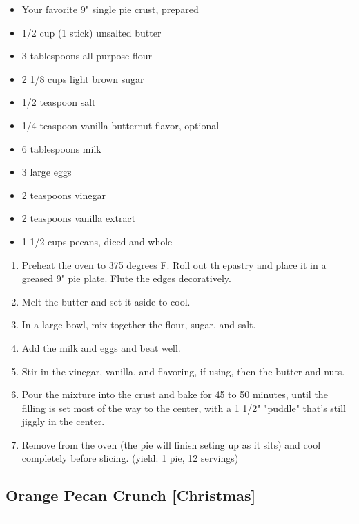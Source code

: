 \documentclass{article}
\begin{document}
\begin{framed}
    \begin{itemize}
        \item Your favorite 9" single pie crust, prepared
        \item 1/2 cup (1 stick) unsalted butter
        \item 3 tablespoons all-purpose flour
        \item 2 1/8 cups light brown sugar
        \item 1/2 teaspoon salt
        \item 1/4 teaspoon vanilla-butternut flavor, optional
        \item 6 tablespoons milk
        \item 3 large eggs
        \item 2 teaspoons vinegar
        \item 2 teaspoons vanilla extract
        \item 1 1/2 cups pecans, diced and whole
    \end{itemize}
\end{framed}

\begin{enumerate}
    \item 
        Preheat the oven to 375 degrees F. Roll out th epastry and place it in a greased 9" pie plate. Flute the edges decoratively.
    \item 
        Melt the butter and set it aside to cool.
    \item 
        In a large bowl, mix together the flour, sugar, and salt.
    \item 
        Add the milk and eggs and beat well.
    \item 
        Stir in the vinegar, vanilla, and flavoring, if using, then the butter and nuts.
    \item 
        Pour the mixture into the crust and bake for 45 to 50 minutes, until the filling is set most of the way to the center, with a 1 1/2" "puddle" that's still jiggly in the center.
    \item 
        Remove from the oven (the pie will finish seting up as it sits) and cool completely before slicing. (yield: 1 pie, 12 servings)
\end{enumerate}
\newpage 

\subsection{Orange Pecan Crunch [Christmas]} 
\noindent\rule[0.5ex]{\linewidth}{1pt}
\end{document}
